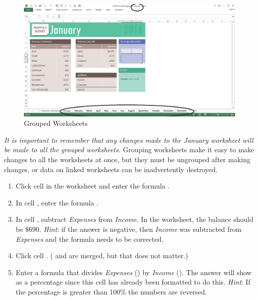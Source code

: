 \begin{figure}[H]
	\centering
	\includegraphics[width=\maxwidth{.95\linewidth}]{gfx/ch06_fig04}
	\caption{Grouped Worksheets}
	\label{06:fig04}
\end{figure}

\textit{It is important to remember that any changes made to the January worksheet will be made to all the grouped worksheets.} Grouping worksheets make it easy to make changes to all the worksheets at once, but they must be ungrouped after making changes, or data on linked worksheets can be inadvertently destroyed. 

\begin{enumbox}
	\begin{enumerate}
		\item Click cell  in the  worksheet and enter the formula .
		\item In cell , enter the formula .
		\item In cell , subtract \textit{Expenses} from \textit{Income}. In the  worksheet, the balance should be $ \$690 $. \textit{Hint}: if the answer is negative, then \textit{Income} was subtracted from \textit{Expenses} and the formula needs to be corrected.
		\item Click cell . ( and  are merged, but that does not matter.)
		\item Enter a formula that divides \textit{Expenses} () by \textit{Income} (). The answer will show as a percentage since this cell has already been formatted to do this. \textit{Hint}: If the percentage is greater than 100\% the numbers are reversed.
	\end{enumerate}
\end{enumbox}

